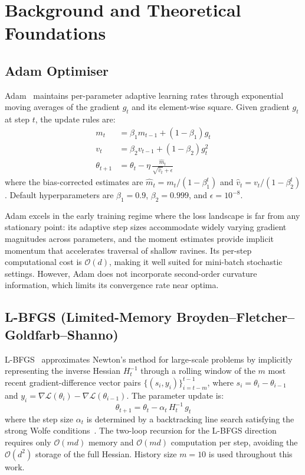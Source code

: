 \documentclass[11pt]{article}
\begin{document}
\section{Background and Theoretical Foundations}

\subsection{Adam Optimiser}

Adam~\cite{kingma2015adam} maintains per-parameter adaptive learning
rates through exponential moving averages of the gradient $g_t$ and
its element-wise square.  Given gradient $g_t$ at step $t$, the
update rules are:
\begin{align}
m_t &= \beta_1 m_{t-1} + (1-\beta_1)g_t \label{eq:adam1}\\
v_t &= \beta_2 v_{t-1} + (1-\beta_2)g_t^2 \label{eq:adam2}\\
\theta_{t+1} &= \theta_t - \eta\,\frac{\hat{m}_t}{\sqrt{\hat{v}_t}+\epsilon}
\label{eq:adam3}
\end{align}
where the bias-corrected estimates are $\hat{m}_t = m_t/(1-\beta_1^t)$
and $\hat{v}_t = v_t/(1-\beta_2^t)$.  Default hyperparameters are
$\beta_1 = 0.9$, $\beta_2 = 0.999$, and $\epsilon = 10^{-8}$.

Adam excels in the early training regime where the loss landscape is
far from any stationary point: its adaptive step sizes accommodate
widely varying gradient magnitudes across parameters, and the moment
estimates provide implicit momentum that accelerates traversal of
shallow ravines.  Its per-step computational cost is $\mathcal{O}(d)$,
making it well suited for mini-batch stochastic settings.  However,
Adam does not incorporate second-order curvature information, which
limits its convergence rate near optima.

\subsection{L-BFGS (Limited-Memory Broyden--Fletcher--Goldfarb--Shanno)}

L-BFGS~\cite{liu1989lbfgs,byrd1995} approximates Newton's method for
large-scale problems by implicitly representing the inverse Hessian
$H_t^{-1}$ through a rolling window of the $m$ most recent
gradient-difference vector pairs $\{(s_i, y_i)\}_{i=t-m}^{t-1}$,
where $s_i = \theta_i - \theta_{i-1}$ and
$y_i = \nabla\mathcal{L}(\theta_i) - \nabla\mathcal{L}(\theta_{i-1})$.
The parameter update is:
\begin{equation}
\theta_{t+1} = \theta_t - \alpha_t\,H_t^{-1}\,g_t
\label{eq:lbfgs}
\end{equation}
where the step size $\alpha_t$ is determined by a backtracking line
search satisfying the strong Wolfe conditions~\cite{wolfe1969}.  The
two-loop recursion for the L-BFGS direction requires only
$\mathcal{O}(md)$ memory and $\mathcal{O}(md)$ computation per step,
avoiding the $\mathcal{O}(d^2)$ storage of the full Hessian.  History
size $m = 10$ is used throughout this work.
\end{document}
